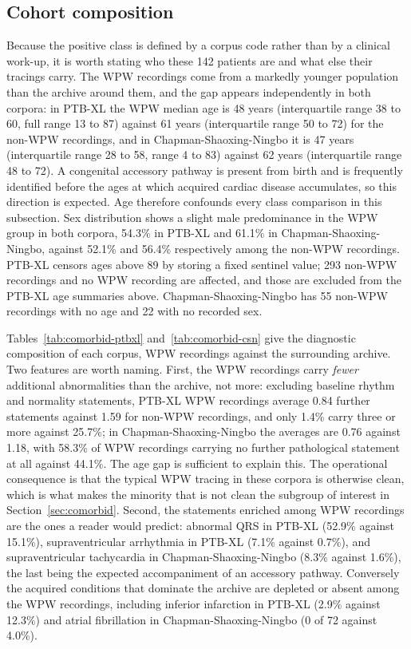 \documentclass[11pt]{article}
\begin{document}
\subsection{Cohort composition}
\label{sec:cohort}

Because the positive class is defined by a corpus code rather than by a clinical work-up, it is worth stating who these 142 patients are and what else their tracings carry. The WPW recordings come from a markedly younger population than the archive around them, and the gap appears independently in both corpora: in PTB-XL the WPW median age is 48 years (interquartile range 38 to 60, full range 13 to 87) against 61 years (interquartile range 50 to 72) for the non-WPW recordings, and in Chapman-Shaoxing-Ningbo it is 47 years (interquartile range 28 to 58, range 4 to 83) against 62 years (interquartile range 48 to 72). A congenital accessory pathway is present from birth and is frequently identified before the ages at which acquired cardiac disease accumulates, so this direction is expected. Age therefore confounds every class comparison in this subsection. Sex distribution shows a slight male predominance in the WPW group in both corpora, 54.3\% in PTB-XL and 61.1\% in Chapman-Shaoxing-Ningbo, against 52.1\% and 56.4\% respectively among the non-WPW recordings. PTB-XL censors ages above 89 by storing a fixed sentinel value; 293 non-WPW recordings and no WPW recording are affected, and those are excluded from the PTB-XL age summaries above. Chapman-Shaoxing-Ningbo has 55 non-WPW recordings with no age and 22 with no recorded sex.

Tables~\ref{tab:comorbid-ptbxl} and~\ref{tab:comorbid-csn} give the diagnostic composition of each corpus, WPW recordings against the surrounding archive. Two features are worth naming. First, the WPW recordings carry \emph{fewer} additional abnormalities than the archive, not more: excluding baseline rhythm and normality statements, PTB-XL WPW recordings average 0.84 further statements against 1.59 for non-WPW recordings, and only 1.4\% carry three or more against 25.7\%; in Chapman-Shaoxing-Ningbo the averages are 0.76 against 1.18, with 58.3\% of WPW recordings carrying no further pathological statement at all against 44.1\%. The age gap is sufficient to explain this. The operational consequence is that the typical WPW tracing in these corpora is otherwise clean, which is what makes the minority that is not clean the subgroup of interest in Section~\ref{sec:comorbid}. Second, the statements enriched among WPW recordings are the ones a reader would predict: abnormal QRS in PTB-XL (52.9\% against 15.1\%), supraventricular arrhythmia in PTB-XL (7.1\% against 0.7\%), and supraventricular tachycardia in Chapman-Shaoxing-Ningbo (8.3\% against 1.6\%), the last being the expected accompaniment of an accessory pathway. Conversely the acquired conditions that dominate the archive are depleted or absent among the WPW recordings, including inferior infarction in PTB-XL (2.9\% against 12.3\%) and atrial fibrillation in Chapman-Shaoxing-Ningbo (0 of 72 against 4.0\%).
\end{document}

